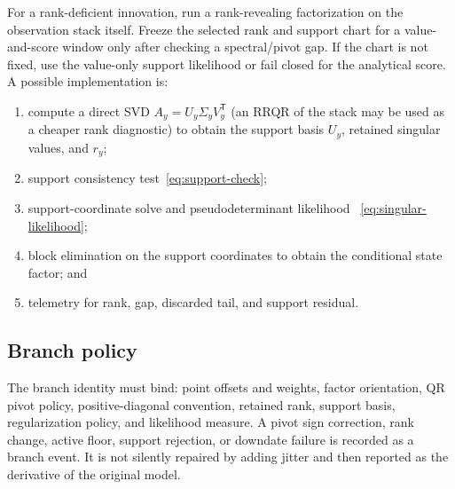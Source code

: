 \documentclass[11pt]{article}
\newcommand{\transpose}{^{\mathsf T}}
\begin{document}
For a rank-deficient innovation, run a rank-revealing factorization on the
observation stack itself.  Freeze the selected rank and support chart for a
value-and-score window only after checking a spectral/pivot gap.  If the chart
is not fixed, use the value-only support likelihood or fail closed for the
analytical score.  A possible implementation is:
\begin{enumerate}
  \item compute a direct SVD $A_y=U_y\Sigma_yV_y\transpose$ (an RRQR of the
        stack may be used as a cheaper rank diagnostic) to obtain the support
        basis $U_y$, retained singular values, and $r_y$;
  \item support consistency test~\eqref{eq:support-check};
  \item support-coordinate solve and pseudodeterminant likelihood
        ~\eqref{eq:singular-likelihood};
  \item block elimination on the support coordinates to obtain the conditional
        state factor; and
  \item telemetry for rank, gap, discarded tail, and support residual.
\end{enumerate}

\subsection{Branch policy}

The branch identity must bind: point offsets and weights, factor orientation,
QR pivot policy, positive-diagonal convention, retained rank, support basis,
regularization policy, and likelihood measure.  A pivot sign correction,
rank change, active floor, support rejection, or downdate failure is recorded
as a branch event.  It is not silently repaired by adding jitter and then
reported as the derivative of the original model.
\end{document}
